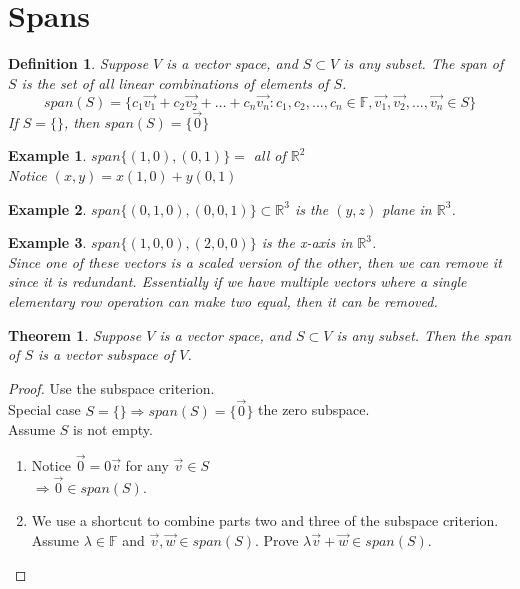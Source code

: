 \documentclass{report}
\newtheorem*{ex}{Example}
\newtheorem*{defn}{Definition}
\newtheorem*{thrm}{Theorem}
\begin{document}
\section{Spans}
\begin{defn}
Suppose $V$ is a vector space, and $S\subset V$ is any subset. The span of $S$ is the set of all linear combinations of elements of $S$.
\[ span(S) = \{ c_1\vec{v_1}+c_2\vec{v_2}+\dots+c_n\vec{v_n}: c_1,c_2,...,c_n \in \mathbb{F}, \vec{v_1},\vec{v_2},...,\vec{v_n} \in S \} \]
If $S=\{\}$, then $span(S)=\{\vec{0}\}$
\end{defn}
\begin{ex}
$span\{(1,0),(0,1)\} =$ all of $\mathbb{R}^2$\\
Notice $(x,y)=x(1,0)+y(0,1)$
\end{ex}
\begin{ex}
$span\{(0,1,0),(0,0,1)\} \subset \mathbb{R}^3$ is the $(y,z)$ plane in $\mathbb{R}^3$.
\end{ex}
\begin{ex}
$span\{(1,0,0),(2,0,0)\}$ is the x-axis in $\mathbb{R}^3$.\\
Since one of these vectors is a scaled version of the other, then we can remove it since it is redundant. Essentially if we have multiple vectors where a single elementary row operation can make two equal, then it can be removed. 
\end{ex}
\begin{thrm}
Suppose $V$ is a vector space, and $S \subset V$ is any subset. Then the span of $S$ is a vector subspace of $V$.
\end{thrm}
\begin{proof}
Use the subspace criterion.\\
Special case $S=\{\} \Rightarrow span(S)=\{\vec{0}\}$ the zero subspace.\\
Assume $S$ is not empty.
	\begin{enumerate}
	\item Notice $\vec{0} = 0\vec{v}$ for any $\vec{v} \in S$\\
	$\Rightarrow \vec{0} \in span(S)$.
	\item We use a shortcut to combine parts two and three of the subspace criterion.\\
	Assume $\lambda \in \mathbb{F}$ and $\vec{v},\vec{w} \in span(S)$. Prove $\lambda\vec{v}+\vec{w} \in span(S)$.
	\end{enumerate}
\end{proof}
\end{document}
